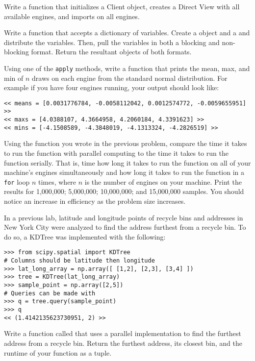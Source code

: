 
Write a function  that initializes a Client object, creates a Direct View with all available engines, and imports  on all engines.

Write a function  that accepts a dictionary of variables. 
Create a  object and a  and distribute the variables.
Then, pull the variables in both a blocking and non-blocking format.
Return the resultant objects of both formats.

Using one of the \texttt{apply} methods, write a function  that prints the mean, max, and min of $n$ draws on each engine from the standard normal distribution.
For example if you have four engines running, your output should look like:
\begin{lstlisting}
<< means = [0.0031776784, -0.0058112042, 0.0012574772, -0.0059655951] >>
<< maxs = [4.0388107, 4.3664958, 4.2060184, 4.3391623] >>
<< mins = [-4.1508589, -4.3848019, -4.1313324, -4.2826519] >>
\end{lstlisting}

Using the function you wrote in the previous problem, compare the time it takes to run the function with parallel computing to the time it takes to run the function serially.
That is, time how long it takes to run the function on all of your machine's engines simultaneously and how long it takes to run the function in a \texttt{for} loop $n$ times, where $n$ is the number of engines on your machine.
Print the results for 1,000,000; 5,000,000; 10,000,000; and 15,000,000 samples.
You should notice an increase in efficiency as the problem size increases.

In a previous lab, latitude and longitude points of recycle bins and addresses in New York City were analyzed to find the address furthest from a recycle bin.
To do so, a KDTree was implemented with the following:

\begin{lstlisting}
>>> from scipy.spatial import KDTree
# Columns should be latitude then longitude
>>> lat_long_array = np.array([ [1,2], [2,3], [3,4] ])
>>> tree = KDTree(lat_long_array)
>>> sample_point = np.array([2,5])
# Queries can be made with
>>> q = tree.query(sample_point)
>>> q
<< (1.4142135623730951, 2) >>
\end{lstlisting}

Write a function called  that uses a parallel implementation to find the furthest address from a recycle bin.
Return the furthest address, its closest bin, and the runtime of your function as a tuple.

